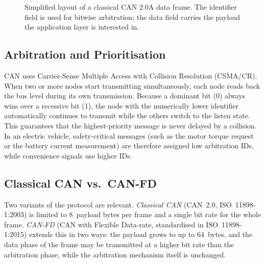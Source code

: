 \documentclass[11pt,a4paper,oneside,parskip=half]{scrreprt}
\begin{document}
\begin{figure}[H]
\centering
{}
\caption{Simplified layout of a classical CAN 2.0A data frame. The identifier field is used for bitwise arbitration; the data field carries the payload the application layer is interested in.}
\label{fig:can_frame}
\end{figure}

\subsection{Arbitration and Prioritisation}
CAN uses Carrier-Sense Multiple Access with Collision Resolution (CSMA/CR). When two or more nodes start transmitting simultaneously, each node reads back the bus level during its own transmission. Because a dominant bit (0) always wins over a recessive bit (1), the node with the numerically lower identifier automatically continues to transmit while the others switch to the listen state. This guarantees that the highest-priority message is never delayed by a collision. In an electric vehicle, safety-critical messages (such as the motor torque request or the battery current measurement) are therefore assigned low arbitration IDs, while convenience signals use higher IDs.

\subsection{Classical CAN vs.\ CAN-FD}
Two variants of the protocol are relevant. \textit{Classical CAN} (CAN~2.0, ISO~11898-1:2003) is limited to 8~payload bytes per frame and a single bit rate for the whole frame. \textit{CAN-FD} (CAN with Flexible Data-rate, standardised in ISO~11898-1:2015) extends this in two ways: the payload grows to up to 64~bytes, and the data phase of the frame may be transmitted at a higher bit rate than the arbitration phase, while the arbitration mechanism itself is unchanged.
\end{document}
